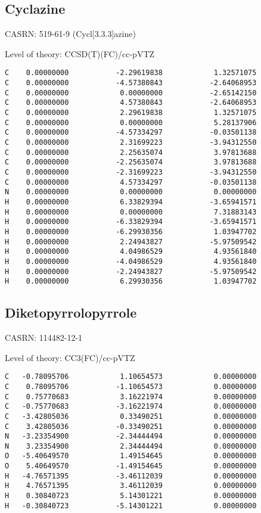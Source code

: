 \documentclass[journal=jctcce,manuscript=article,layout=traditional]{achemso}
\newcommand{\TZ}{cc-pVTZ}
\begin{document}
\subsection{Cyclazine}

CASRN: 519-61-9 (Cycl[3.3.3]azine)

\begin{singlespace}
\noindent Level of theory: CCSD(T)(FC)/{\TZ}
\begin{verbatim}
C    0.00000000           -2.29619838            1.32571075
C    0.00000000           -4.57380843           -2.64068953
C    0.00000000            0.00000000           -2.65142150
C    0.00000000            4.57380843           -2.64068953
C    0.00000000            2.29619838            1.32571075
C    0.00000000            0.00000000            5.28137906
C    0.00000000           -4.57334297           -0.03501138
C    0.00000000            2.31699223           -3.94312550
C    0.00000000            2.25635074            3.97813688
C    0.00000000           -2.25635074            3.97813688
C    0.00000000           -2.31699223           -3.94312550
C    0.00000000            4.57334297           -0.03501138
N    0.00000000            0.00000000            0.00000000
H    0.00000000            6.33829394           -3.65941571
H    0.00000000            0.00000000            7.31883143
H    0.00000000           -6.33829394           -3.65941571
H    0.00000000           -6.29930356            1.03947702
H    0.00000000            2.24943827           -5.97509542
H    0.00000000            4.04986529            4.93561840
H    0.00000000           -4.04986529            4.93561840
H    0.00000000           -2.24943827           -5.97509542
H    0.00000000            6.29930356            1.03947702
\end{verbatim}
\end{singlespace}

\subsection{Diketopyrrolopyrrole}

CASRN: 114482-12-1

\begin{singlespace}
\noindent Level of theory: CC3(FC)/{\TZ}
\begin{verbatim}
C   -0.78095706            1.10654573            0.00000000
C    0.78095706           -1.10654573            0.00000000
C    0.75770683            3.16221974            0.00000000
C   -0.75770683           -3.16221974            0.00000000
C   -3.42805036            0.33490251            0.00000000
C    3.42805036           -0.33490251            0.00000000
N   -3.23354900           -2.34444494            0.00000000
N    3.23354900            2.34444494            0.00000000
O   -5.40649570            1.49154645            0.00000000
O    5.40649570           -1.49154645            0.00000000
H   -4.76571395           -3.46112039            0.00000000
H    4.76571395            3.46112039            0.00000000
H    0.30840723            5.14301221            0.00000000
H   -0.30840723           -5.14301221            0.00000000
\end{verbatim}
\end{singlespace}
\end{document}
